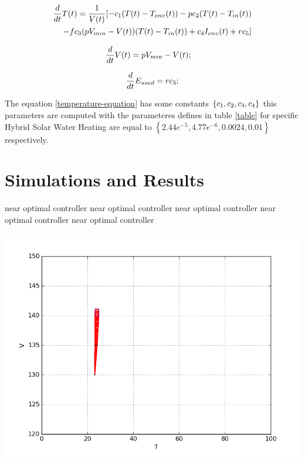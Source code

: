
\begin{equation}
    \begin{aligned}
\frac{d}{dt}T(t) = \frac{1}{V(t)} [ -c_1(T(t)-T_{env}(t))
- p c_{2}(T(t)-T_{in}(t)) \\
- f c_{3}(pV_{min} - V(t))(T(t)-T_{in}(t))
+ c_{4}I_{env}(t)+ 
r c_{5} ]
    \end{aligned}
\label{temperature-equation}    
\end{equation}

\begin{equation}
\frac{d}{dt}V(t) = pV_{min} - V(t); \quad
\label{volume-equation}
\end{equation}

\begin{equation} 
\frac{d}{dt}E_{used} =  r c_{3} ;
\label{Energy-equation}
\end{equation}

The equation \ref{temperature-equation} has some constants $\left\lbrace 
c_1, c_{2}, c_{3}, c_{4} \right\rbrace $ this
parameters are computed with the parameteres defines in table \ref{table} for specific Hybrid Solar Water Heating
are equal to $\left\lbrace 2.44e^{-5},  4.77e^{-6}
, 0.0024, 0.01  \right\rbrace$ respectively.


\section{Simulations and Results}

near optimal controller
near optimal controller
near optimal controller
near optimal controller
near optimal controller

\begin{minipage}{\linewidth}
    \begin{center}
        \includegraphics[width=1.0\linewidth]{content/sources/1}
    \end{center}
\end{minipage}

